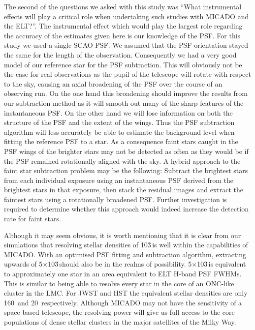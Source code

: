 The second of the questions we asked with this study was ``What instrumental
effects will play a critical role when undertaking such studies with MICADO and
the ELT?''. The instrumental effect which would play the largest role
regarding the accuracy of the estimates given here is our knowledge of the PSF.
For this study we used a single SCAO PSF. We assumed that the PSF orientation
stayed the same for the length of the observation. Consequently we had a very
good model of our reference star for the PSF subtraction. This will obviously
not be the case for real observations as the pupil of the telescope will rotate
with respect to the sky, causing an axial broadening of the PSF over the course
of an observing run. On the one hand this broadening should improve the results
from our subtraction method as it will smooth out many of the sharp features
of the instantaneous PSF. On the other hand we will lose information on both
the structure of the PSF and the extent of the wings. Thus the PSF subtraction
algorithm will less accurately be able to estimate the background level when
fitting the reference PSF to a star. As a consequence faint stars caught in the
PSF wings of the brighter stars may not be detected as often as they would be
if the PSF remained rotationally aligned with the sky. A hybrid approach to the
faint star subtraction problem may be the following: Subtract the brightest
stars from each individual exposure using an instantaneous PSF derived from the
brightest stars in that exposure, then stack the residual images and extract
the faintest stars using a rotationally broadened PSF. Further investigation is
required to determine whether this approach would indeed increase the detection
rate for faint stars.

Although it may seem obvious, it is worth mentioning that it is clear from our
simulations that resolving stellar densities of 10\h3\,\spa is well
within the capabilities of MICADO. With an optimised PSF fitting and
subtraction algorithm, extracting upwards of 5$\times$10\h3\,\spa should also
be in the realms of possibility. 5$\times$10\h3\,\spa is equivalent to
approximately one star in an area equivalent to  ELT H-band PSF
FWHMs.
This is similar to being able to resolve every star in the core of an ONC-like
cluster in the LMC. For JWST and HST the equivalent stellar densities are only
160~\spa and 20~\spa respectively. Although MICADO may not have the sensitivity
of a space-based telescope, the resolving power will give us full access to the
core populations of dense stellar clusters in the major satellites of the
Milky Way.


